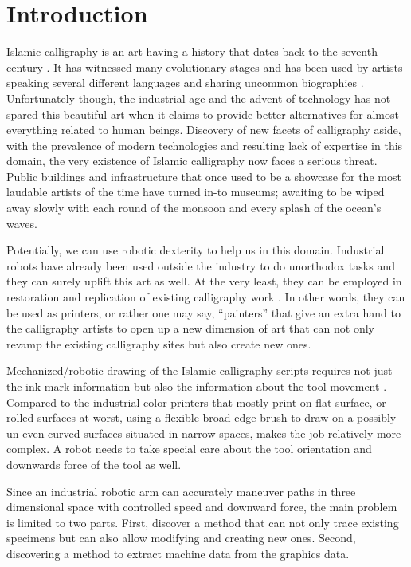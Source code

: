 \section{Introduction}
\label{Chapter:Introduction}
{
    Islamic calligraphy is an art having a history that dates back to the seventh century \cite{bib01, bib02}. It has witnessed many evolutionary stages \cite{bib02, bib03} and has been used by artists speaking several different languages \cite{bib04} and sharing uncommon biographies \cite{bib05,bib06,bib07,bib08}. Unfortunately though, the industrial age and the advent of technology has not spared this beautiful art when it claims to provide better alternatives for almost everything related to human beings. Discovery of new facets of calligraphy aside, with the prevalence of modern technologies and resulting lack of expertise in this domain, the very existence of Islamic calligraphy now faces a serious threat. Public buildings and infrastructure that once used to be a showcase for the most laudable artists of the time have turned in-to museums; awaiting to be wiped away slowly with each round of the monsoon and every splash of the ocean’s waves.

    Potentially, we can use robotic dexterity to help us in this domain. Industrial robots have already been used outside the industry to do unorthodox tasks \cite{bib09, bib10,bib11,bib12} and they can surely uplift this art as well. At the very least, they can be employed in restoration and replication of existing calligraphy work \cite{bib13}. In other words, they can be used as printers, or rather one may say, “painters” that give an extra hand to the calligraphy artists to open up a new dimension of art that can not only revamp the existing calligraphy sites but also create new ones.

    Mechanized/robotic drawing of the Islamic calligraphy scripts requires not just the ink-mark information but also the information about the tool movement \cite{bib03}. Compared to the industrial color printers that mostly print on flat surface, or rolled surfaces at worst, using a flexible broad edge brush to draw on a possibly un-even curved surfaces situated in narrow spaces, makes the job relatively more complex. A robot needs to take special care about the tool orientation and downwards force of the tool as well.

    Since an industrial robotic arm can accurately maneuver paths in three dimensional space with controlled speed and downward force, the main problem is limited to two parts. First, discover a method that can not only trace existing specimens but can also allow modifying and creating new ones. Second, discovering a method to extract machine data from the graphics data.

}
